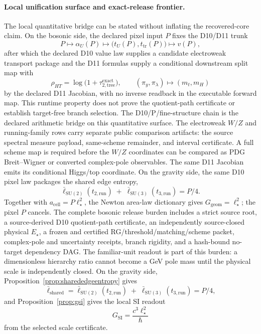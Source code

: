 \documentclass[11pt]{article}
\newcommand{\ellbar}{\bar{\ell}}
\begin{document}
\paragraph{Local unification surface and exact-release frontier.}
The local quantitative bridge can be stated without inflating the recovered-core claim. On the
bosonic side, the declared pixel input \(P\) fixes the D10/D11 trunk
\[
P\longmapsto \alpha_U(P) \longmapsto \bigl(t_U(P),t_{\mathrm{tr}}(P)\bigr)\longmapsto v(P),
\]
after which the declared D10 value law supplies a candidate electroweak transport
package and the D11 formulas supply a conditional downstream split map with
\[
\rho_{HT}=\log\!\bigl(1+\tau_{2,\mathrm{tree}}^{\mathrm{exact}}\bigr),
\qquad
(\pi_y,\pi_\lambda)\longmapsto (m_t,m_H)
\]
by the declared D11 Jacobian, with no inverse readback in the executable forward
map. This runtime property does not prove the quotient-path certificate or
establish target-free branch selection. The D10/P/fine-structure chain is
the declared arithmetic bridge on this quantitative surface. The electroweak
\(W/Z\) and running-family rows carry separate public comparison artifacts:
the source spectral measure payload, same-scheme remainder, and interval
certificate. A full scheme map is required before the \(W/Z\) coordinates can be compared as PDG
Breit--Wigner or converted complex-pole observables. The same D11 Jacobian emits its conditional
Higgs/top coordinate.
On the gravity side, the same D10 pixel law packages the shared edge entropy,
\[
\ellbar_{\mathrm{SU(2)}}(t_{2,\mathrm{run}})
\;+\;
\ellbar_{\mathrm{SU(3)}}(t_{3,\mathrm{run}})
=
P/4.
\]
Together with \(a_{\mathrm{cell}}=P\ell_\star^2\), the Newton area-law dictionary gives
\(G_{\mathrm{geom}}=\ell_\star^2\); the pixel \(P\) cancels.
The complete bosonic release burden includes a strict source root, a
source-derived D10 quotient-path certificate, an independently source-closed
physical \(E_\star\), a frozen and certified
RG/threshold/matching/scheme packet, complex-pole and uncertainty receipts,
branch rigidity, and a hash-bound no-target dependency DAG.  The familiar-unit
readout is part of this burden: a dimensionless hierarchy ratio cannot become a
GeV pole mass until the physical scale is independently closed.  On the
gravity side,
Proposition~\ref{prop:sharededgeentropy} gives
\[
\ellbar_{\mathrm{shared}}
=
\ellbar_{\mathrm{SU(2)}}(t_{2,\mathrm{run}})
\;+\;
\ellbar_{\mathrm{SU(3)}}(t_{3,\mathrm{run}})
=
P/4,
\]
and Proposition~\ref{prop:gsi} gives the local SI readout
\[
G_{\mathrm{SI}}=\frac{c^3\ell_\star^2}{\hbar}
\]
from the selected scale certificate.
\end{document}
